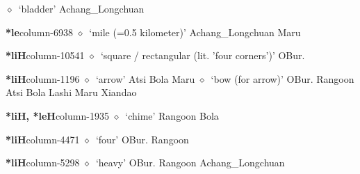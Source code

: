          $\diamond$~`bladder'
         Achang\_Longchuan 
  \item {\footnotesize \textbf{*le}}{\tiny column-6938}
         $\diamond$~`mile (=0.5 kilometer)'
         Achang\_Longchuan 
\hspace{1ex}
         Maru 
  \item {\footnotesize \textbf{*liH}}{\tiny column-10541}
         $\diamond$~`square / rectangular (lit. 'four corners')'
         OBur. 
  \item {\footnotesize \textbf{*liH}}{\tiny column-1196}
         $\diamond$~`arrow'
         Atsi 
\hspace{1ex}
         Bola 
\hspace{1ex}
         Maru 
\hspace{1ex}
         $\diamond$~`bow (for arrow)'
         OBur. 
\hspace{1ex}
         Rangoon 
\hspace{1ex}
         Atsi 
\hspace{1ex}
         Bola 
\hspace{1ex}
         Lashi 
\hspace{1ex}
         Maru 
\hspace{1ex}
         Xiandao 
  \item {\footnotesize \textbf{*liH, *leH}}{\tiny column-1935}
         $\diamond$~`chime'
         Rangoon 
\hspace{1ex}
         Bola 
  \item {\footnotesize \textbf{*liH}}{\tiny column-4471}
         $\diamond$~`four'
         OBur. 
\hspace{1ex}
         Rangoon 
  \item {\footnotesize \textbf{*liH}}{\tiny column-5298}
         $\diamond$~`heavy'
         OBur. 
\hspace{1ex}
         Rangoon 
\hspace{1ex}
         Achang\_Longchuan 
